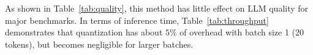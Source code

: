 
\begin{table}[tb]
\centering
\caption{Zero-shot accuracy for OPT-175B and BLOOM-176B with 8-bit and 16-bit weights.\nocite{eval-harness}}
\vspace{-5pt}
\label{tab:quality}
\end{table}

As shown in Table~\ref{tab:quality}, this method has little effect on LLM quality for major benchmarks.
In terms of inference time, Table~\ref{tab:throughput} demonstrates that quantization has about $5\%$ of overhead with batch size 1 (20 tokens), but becomes negligible for larger batches.





